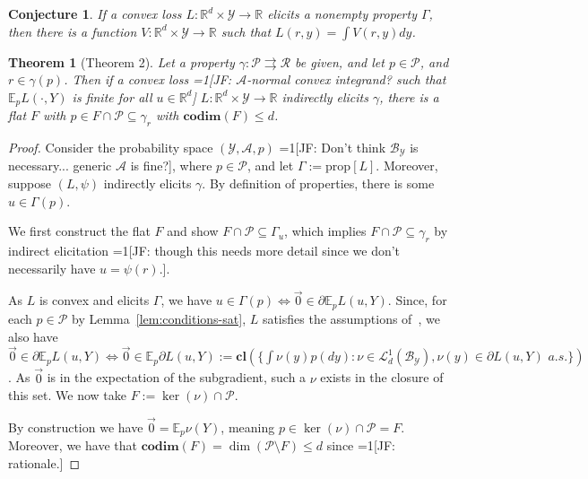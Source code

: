 \documentclass[12pt]{article}
\newcommand{\Comments}{1}
\newcommand{\mynote}[2]{\ifnum\Comments=1\textcolor{#1}{#2}\fi}
\newcommand{\jessie}[1]{\mynote{green!75!black}{[JF: #1]}}
\newcommand{\reals}{\mathbb{R}}
\newcommand{\toto}{\rightrightarrows}
\newcommand{\A}{\mathcal{A}}
\newcommand{\B}{\mathcal{B}}
\newcommand{\E}{\mathbb{E}}
\renewcommand{\L}{\mathcal{L}}
\renewcommand{\P}{\mathcal{P}}
\newcommand{\R}{\mathcal{R}}
\newcommand{\Y}{\mathcal{Y}}
\newcommand{\cl}{\mathbf{cl}}
\newcommand{\codim}{\mathbf{codim}}
\newcommand{\prop}[1]{\mathrm{prop}[#1]}
\newtheorem{theorem}{Theorem}
\newtheorem{conjecture}{Conjecture}
\begin{document}
\begin{conjecture}
	If a convex loss $L:\reals^d \times \Y \to \reals$ elicits a nonempty property $\Gamma$, then there is a function $V:\reals^d \times\Y \to \reals$ such that $L(r,y) = \int V(r,y) dy$.
\end{conjecture}

\begin{theorem}[Theorem 2]
	Let a property $\gamma : \P \toto \R$ be given, and let $p \in \P$, and $r \in \gamma(p)$.
	Then if a convex loss \jessie{$\A$-normal convex integrand? such that $\E_p L(\cdot,Y)$ is finite for all $u \in \reals^d$} $L : \reals^d \times \Y \to \reals$ indirectly elicits $\gamma$, there is a flat $F$ with $p \in F \cap \P \subseteq \gamma_r$ with $\codim(F) \leq d$.
\end{theorem}
\begin{proof}
	Consider the probability space $(\Y, \A, p)$ \jessie{Don't think $\B_\Y$ is necessary... generic $\A$ is fine?}, where $p \in \P$, and let $\Gamma := \prop{L}$.
	Moreover, suppose $(L, \psi)$ indirectly elicits $\gamma$.
	By definition of properties, there is some $u \in \Gamma(p)$.
	
	We first construct the flat $F$ and show $F \cap \P \subseteq \Gamma_u$, which implies $F \cap \P \subseteq \gamma_r$ by indirect elicitation \jessie{though this needs more detail since we don't necessarily have $u = \psi(r)$.}. 
	
	As $L$ is convex and elicits $\Gamma$, we have $u \in \Gamma(p) \iff \vec 0 \in \partial \E_p L(u,Y)$.
	Since, for each $p \in \P$ by Lemma~\ref{lem:conditions-sat}, $L$ satisfies the assumptions of~\cite[Corollary 1]{rockafellar1982interchange}, we also have $\vec 0 \in \partial \E_p L(u,Y) \iff \vec 0 \in \E_p \partial L(u,Y) := \cl(\{\int \nu(y) p(dy) : \nu \in \L^1_d(\B_\Y), \nu(y) \in \partial L(u,Y)\,\, a.s.\})$.
	As $\vec 0$ is in the expectation of the subgradient, such a $\nu$ exists in the closure of this set.
	We now take $F := \ker(\nu) \cap \P$.
	
	By construction we have $\vec 0 = \E_p \nu(Y)$, meaning $p \in \ker(\nu) \cap \P = F$.
	Moreover, we have that $\codim(F) = \dim(\P \setminus F) \leq d$ since \jessie{rationale.}
\end{proof}
\end{document}
